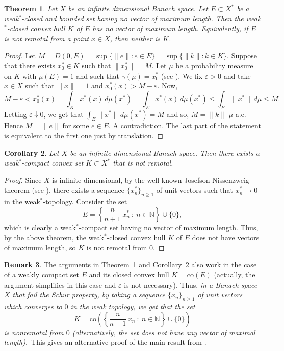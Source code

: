 \documentclass[11pt,a4paper]{amsart}
\theoremstyle{plain}
\newtheorem{thm}{Theorem}
\newtheorem{corollary}[thm]{Corollary}
\theoremstyle{definition}
\newtheorem{rem}[thm]{Remark}
\newcommand{\cconv}{\overline{\mathrm{co}}}
\newcommand{\N}{\ensuremath{\mathbb{N}}}
\renewcommand{\leq}{\leqslant}
\renewcommand{\geq}{\geqslant}
\renewcommand{\epsilon}{\varepsilon}
\begin{document}
\begin{thm}\label{theorem-1} Let $X$ be an infinite dimensional Banach space.
Let $E \subset X^\ast$ be a weak$^\ast$-closed and bounded set
having no vector of maximum length. Then the weak$^\ast$-closed
convex hull $K$ of $E$ has no vector of maximum length.
Equivalently, if $E$ is not remotal from a point $x\in X$, then
neither is $K$.
\end{thm}

\begin{proof} Let $M= D(0,E)=\sup\{\|e\|:e\in E\}=\sup\{\|k\|:k\in K\}$.
Suppose that there exists $x_0^\ast \in K$ such that
$\|x_0^\ast\|=M$. Let $\mu$ be a probability measure on $K$ with
$\mu(E)=1$ and such that $\gamma(\mu)=x_0^\ast$ (see
\cite[Proposition~1.1]{Phelps}). We fix $\epsilon
>0$ and take $x \in X$  such that $\|x\|=1$ and
$x_0^\ast(x)>M-\epsilon$. Now,
$$
M-\epsilon < x_0^\ast(x)=\int_K x^\ast(x)\, d\mu(x^\ast)=\int_E x^\ast(x)\, d\mu(x^\ast) \leq \int_E
\|x^\ast\|\, d\mu \leq M.
$$
Letting $\epsilon\downarrow 0$, we get that $\displaystyle
\int_E\|x^\ast\|\,d\mu(x^\ast)=M$ and so, $M = \|k\|$ $\mu$-a.e.
Hence $M=\|e\|$ for some $e \in E$. A contradiction. The last part
of the statement is equivalent to the first one just by
translation.
\end{proof}

\begin{corollary}\label{cor-2}
Let $X$ be an infinite dimensional Banach space. Then there exists
a weak$^\ast$-compact convex set $K \subset X^\ast$ that is not
remotal.
\end{corollary}

\begin{proof}
Since $X$ is infinite dimensional, by the well-known
Josefson-Nissenzweig theorem (see \cite[p.~219]{D}), there exists a
sequence $\{x_n^\ast\}_{n \geq 1}$ of unit vectors such that
$x_n^\ast \longrightarrow 0$ in the weak$^\ast$-topology. Consider
the set
$$
E = \left\{\frac{n}{n+1}\,x_n^\ast\ : \ n\in \N\right\}\cup \{0\},
$$
which is clearly a weak$^\ast$-compact set having no vector of
maximum length. Thus, by the above theorem, the weak$^\ast$-closed
convex hull $K$ of $E$ does not have vectors of maximum length, so
$K$ is not remotal from $0$.
\end{proof}

\begin{rem}\label{remark3}
The arguments in Theorem~\ref{theorem-1} and Corollary~\ref{cor-2}
also work in the case of a weakly compact set $E$ and its closed
convex hull $K=\cconv(E)$ (actually, the argument simplifies in
this case and $\epsilon$ is not necessary). Thus, {\slshape in a
Banach space $X$ that fail the Schur property, by taking a
sequence $\{x_n\}_{n \geq 1}$ of unit vectors which converges to
$0$ in the weak topology, we get that the set
$$
K= \cconv\left(\left\{\frac{n}{n+1}\,x_n\ : \ n\in \N\right\}\cup \{0\}\right)
$$
is nonremotal from $0$ (alternatively, the set does not have any
vector of maximal length).}\ This gives an alternative proof of the
main result from \cite{R}.
\end{rem}
\end{document}

